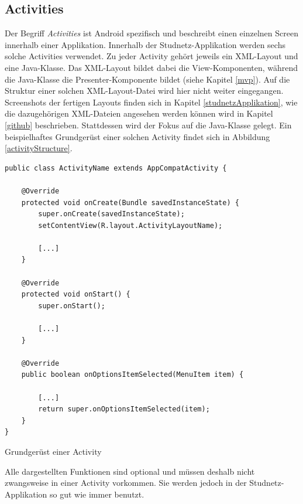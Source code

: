 \documentclass[../main.tex]{subfiles}
\begin{document}
	\subsection{Activities} \label{activities}
	Der Begriff \emph{Activities} ist Android spezifisch und beschreibt einen einzelnen Screen innerhalb einer Applikation. Innerhalb der Studnetz-Applikation werden sechs solche Activities verwendet. Zu jeder Activity gehört jeweils ein XML-Layout und eine Java-Klasse. Das XML-Layout bildet dabei die View-Komponenten, während die Java-Klasse die Presenter-Komponente bildet (siehe Kapitel \ref{mvp}). Auf die Struktur einer solchen XML-Layout-Datei wird hier nicht weiter eingegangen. Screenshots der fertigen Layouts finden sich in Kapitel \ref{studnetzApplikation}, wie die dazugehörigen XML-Dateien angesehen werden können wird in Kapitel \ref{github} beschrieben. Stattdessen wird der Fokus auf die Java-Klasse gelegt. Ein beispielhaftes Grundgerüst einer solchen Activity findet sich in Abbildung \ref{activityStructure}.
	
\begin{code}
	\begin{center}
		\begin{verbatim}
public class ActivityName extends AppCompatActivity {
			
	@Override
	protected void onCreate(Bundle savedInstanceState) {
		super.onCreate(savedInstanceState);
		setContentView(R.layout.ActivityLayoutName);
		
		[...]	
	}
	
	@Override
	protected void onStart() {
		super.onStart();
		
		[...]
	}
	
	@Override
	public boolean onOptionsItemSelected(MenuItem item) {
		
		[...]
		return super.onOptionsItemSelected(item);
	}
}	
		\end{verbatim}
		\caption{Grundgerüst einer Activity}
		\label{activityStructure}
	\end{center}
	
\end{code}

	Alle dargestellten Funktionen sind optional und müssen deshalb nicht zwangsweise in einer Activity vorkommen. Sie werden jedoch in der Studnetz-Applikation so gut wie immer benutzt.
\end{document}
